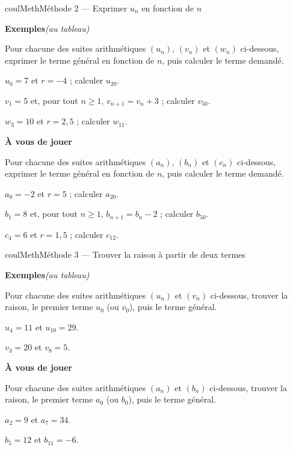 \documentclass[11pt,a4paper]{article}
\makeatletter
\renewcommand{\ge}{\geqslant}
\newcounter{lycee@signet}
\newcommand{\signet}[3][]{\stepcounter{lycee@signet}%
  \edef\lycee@dest{\if\relax\detokenize{#1}\relax
    signet.\arabic{lycee@signet}\else#1\fi}%
  \hypertarget{\lycee@dest}{}\bookmark[level=#2,dest=\lycee@dest]{#3}}
\newcounter{methode}
\newenvironment{methodebox}[1][Méthode]{\stepcounter{methode}%
  \begin{boitecours}[phantom={\signet[methode-\arabic{methode}]{2}{#1}}]{coulMeth}{#1}}%
  {\end{boitecours}}
\newcommand{\etape}[1]{\par\smallskip\textbf{\color{coulMeth}#1}\par\nobreak\smallskip}
\newcommand{\autableau}{\hfill{\footnotesize\itshape\color{black!45}(au tableau)}}
\newcommand{\etapeexemples}{%
    \par\smallskip\textbf{\color{coulMeth}Exemples}\autableau\par\nobreak\smallskip}
\makeatother
\begin{document}
\begin{methodebox}[Méthode 2 --- Exprimer $u_{n}$ en fonction de $n$]
\etapeexemples
Pour chacune des suites arithmétiques $(u_{n})$, $(v_{n})$ et $(w_{n})$ ci-dessous, exprimer
le terme général en fonction de $n$, puis calculer le terme demandé.
\begin{questions}[label=\alph*)]
  \item $u_{0}=7$ et $r=-4$ ; calculer $u_{20}$.
  \item $v_{1}=5$ et, pour tout $n\ge 1$, $v_{n+1}=v_{n}+3$ ; calculer $v_{50}$.
  \item $w_{3}=10$ et $r=2{,}5$ ; calculer $w_{11}$.
\end{questions}

\etape{À vous de jouer}
Pour chacune des suites arithmétiques $(a_{n})$, $(b_{n})$ et $(c_{n})$ ci-dessous, exprimer
le terme général en fonction de $n$, puis calculer le terme demandé.
\begin{questions}[label=\alph*)]
  \item $a_{0}=-2$ et $r=5$ ; calculer $a_{20}$.
  \item $b_{1}=8$ et, pour tout $n\ge 1$, $b_{n+1}=b_{n}-2$ ; calculer $b_{50}$.
  \item $c_{4}=6$ et $r=1{,}5$ ; calculer $c_{12}$.
\end{questions}

\end{methodebox}

\begin{methodebox}[Méthode 3 --- Trouver la raison à partir de deux termes]
\etapeexemples
Pour chacune des suites arithmétiques $(u_{n})$ et $(v_{n})$ ci-dessous, trouver la raison,
le premier terme $u_{0}$ (ou $v_{0}$), puis le terme général.
\begin{questions}[label=\alph*)]
  \item $u_{4}=11$ et $u_{10}=29$.
  \item $v_{3}=20$ et $v_{8}=5$.
\end{questions}

\etape{À vous de jouer}
Pour chacune des suites arithmétiques $(a_{n})$ et $(b_{n})$ ci-dessous, trouver la raison,
le premier terme $a_{0}$ (ou $b_{0}$), puis le terme général.
\begin{questions}[label=\alph*)]
  \item $a_{2}=9$ et $a_{7}=34$.
  \item $b_{5}=12$ et $b_{11}=-6$.
\end{questions}

\end{methodebox}
\end{document}

